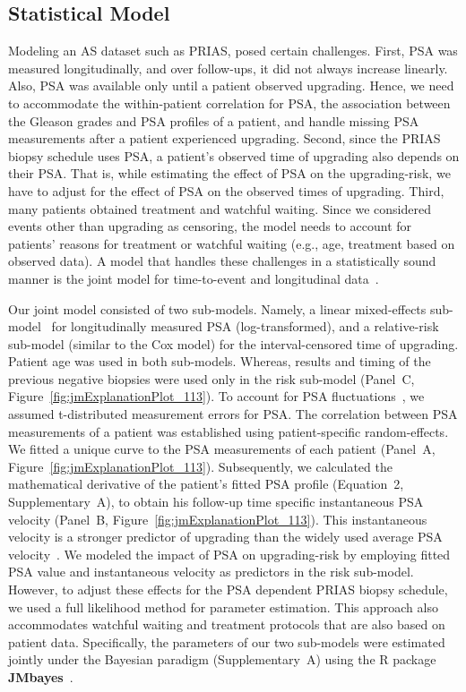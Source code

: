 \subsection{Statistical Model}
Modeling an AS dataset such as PRIAS, posed certain challenges. First, PSA was measured longitudinally, and over follow-ups, it did not always increase linearly. Also, PSA was available only until a patient observed upgrading. Hence, we need to accommodate the within-patient correlation for PSA, the association between the Gleason grades and PSA profiles of a patient, and handle missing PSA measurements after a patient experienced upgrading. Second, since the PRIAS biopsy schedule uses PSA, a patient's observed time of upgrading also depends on their PSA. That is, while estimating the effect of PSA on the upgrading-risk, we have to adjust for the effect of PSA on the observed times of upgrading. Third, many patients obtained treatment and watchful waiting. Since we considered events other than upgrading as censoring, the model needs to account for patients' reasons for treatment or watchful waiting (e.g., age, treatment based on observed data). A model that handles these challenges in a statistically sound manner is the joint model for time-to-event and longitudinal data~\citep{tomer2019,coley2017prediction,rizopoulos2012joint}. 

Our joint model consisted of two sub-models. Namely, a linear mixed-effects sub-model~\citep{laird1982random} for longitudinally measured PSA (log-transformed), and a relative-risk sub-model (similar to the Cox model) for the interval-censored time of upgrading. Patient age was used in both sub-models. Whereas, results and timing of the previous negative biopsies were used only in the risk sub-model (Panel~C, Figure~\ref{fig:jmExplanationPlot_113}). To account for PSA fluctuations~\citep{nixon1997biological}, we assumed t-distributed measurement errors for PSA. The correlation between PSA measurements of a patient was established using patient-specific random-effects. We fitted a unique curve to the PSA measurements of each patient (Panel~A, Figure~\ref{fig:jmExplanationPlot_113}). Subsequently, we calculated the mathematical derivative of the patient's fitted PSA profile (Equation~2, Supplementary~A), to obtain his follow-up time specific instantaneous PSA velocity (Panel~B, Figure~\ref{fig:jmExplanationPlot_113}). This instantaneous velocity is a stronger predictor of upgrading than the widely used average PSA velocity~\citep{cooperberg2018refined}. We modeled the impact of PSA on upgrading-risk by employing fitted PSA value and instantaneous velocity as predictors in the risk sub-model. However, to adjust these effects for the PSA dependent PRIAS biopsy schedule, we used a full likelihood method for parameter estimation. This approach also accommodates watchful waiting and treatment protocols that are also based on patient data. Specifically, the parameters of our two sub-models were estimated jointly under the Bayesian paradigm (Supplementary~A) using the R package \textbf{JMbayes}~\citep{rizopoulosJMbayes}.

